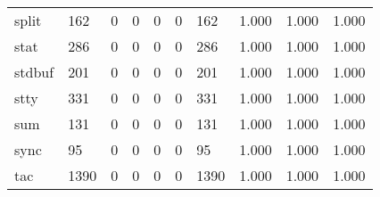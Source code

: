 \begin{longtable}{lp{2.0cm}p{2.0cm}p{2.0cm}p{2.0cm}p{2.0cm}p{2.0cm}p{2.0cm}p{2.0cm}p{2.0cm}}
split     &                    162 &                                  0 &                                 0 &                                0 &                                 0 &                             162 &                                1.000 &                                  1.000 &                                1.000 \\
stat      &                    286 &                                  0 &                                 0 &                                0 &                                 0 &                             286 &                                1.000 &                                  1.000 &                                1.000 \\
stdbuf    &                    201 &                                  0 &                                 0 &                                0 &                                 0 &                             201 &                                1.000 &                                  1.000 &                                1.000 \\
stty      &                    331 &                                  0 &                                 0 &                                0 &                                 0 &                             331 &                                1.000 &                                  1.000 &                                1.000 \\
sum       &                    131 &                                  0 &                                 0 &                                0 &                                 0 &                             131 &                                1.000 &                                  1.000 &                                1.000 \\
sync      &                     95 &                                  0 &                                 0 &                                0 &                                 0 &                              95 &                                1.000 &                                  1.000 &                                1.000 \\
tac       &                   1390 &                                  0 &                                 0 &                                0 &                                 0 &                            1390 &                                1.000 &                                  1.000 &                                1.000 \\

\end{longtable}
